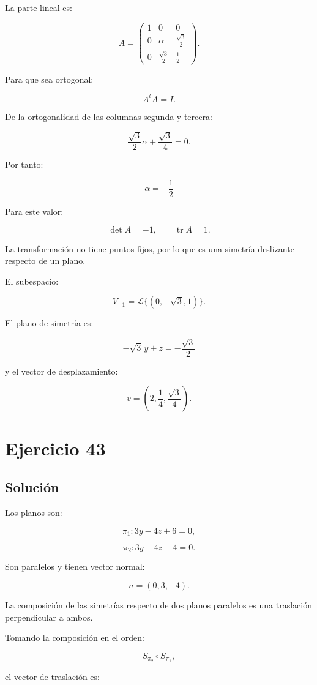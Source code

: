 \documentclass[11pt,a4paper]{article}
\newcommand{\tr}{\operatorname{tr}}
\begin{document}
La parte lineal es:

\[
A=
\begin{pmatrix}
1&0&0\\
0&\alpha&\frac{\sqrt3}{2}\\
0&\frac{\sqrt3}{2}&\frac12
\end{pmatrix}.
\]

Para que sea ortogonal:

\[
A^tA=I.
\]

De la ortogonalidad de las columnas segunda y tercera:

\[
\frac{\sqrt3}{2}\alpha
+
\frac{\sqrt3}{4}
=
0.
\]

Por tanto:

\[
\boxed{
\alpha=-\frac12
}
\]

Para este valor:

\[
\det A=-1,
\qquad
\tr A=1.
\]

La transformación no tiene puntos fijos, por lo que es una simetría deslizante respecto de un plano.

El subespacio:

\[
V_{-1}
=
\mathcal L\{(0,-\sqrt3,1)\}.
\]

El plano de simetría es:

\[
\boxed{
-\sqrt3\,y+z=-\frac{\sqrt3}{2}
}
\]

y el vector de desplazamiento:

\[
\boxed{
v=
\left(
2,\frac14,\frac{\sqrt3}{4}
\right).
}
\]

\section{Ejercicio 43}
\subsection{Solución}

Los planos son:

\[
\pi_1:
3y-4z+6=0,
\]

\[
\pi_2:
3y-4z-4=0.
\]

Son paralelos y tienen vector normal:

\[
n=(0,3,-4).
\]

La composición de las simetrías respecto de dos planos paralelos es una traslación perpendicular a ambos.

Tomando la composición en el orden:

\[
S_{\pi_2}\circ S_{\pi_1},
\]

el vector de traslación es:
\end{document}
